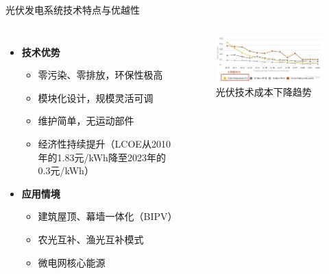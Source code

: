 \documentclass[aspectratio=169]{beamer}
\begin{document}
\begin{frame}{光伏发电系统技术特点与优越性}
  \begin{columns}
    \begin{itemize}
      \item \textbf{技术优势}
        \begin{itemize}
          \item 零污染、零排放，环保性极高
          \item 模块化设计，规模灵活可调
          \item 维护简单，无运动部件
          \item 经济性持续提升（LCOE从2010年的1.83元/kWh降至2023年的0.3元/kWh）\cite{Wang2023}
        \end{itemize}
      \item \textbf{应用情境}
        \begin{itemize}
          \item 建筑屋顶、幕墙一体化（BIPV）
          \item 农光互补、渔光互补模式
          \item 微电网核心能源
        \end{itemize}
    \end{itemize}
    \begin{figure}
      \centering
      \caption{光伏技术成本下降趋势}
      \includegraphics[width=\textwidth]{fig/光伏价格趋势.jpg}
    \end{figure}
  \end{columns}
\end{frame}
\end{document}
